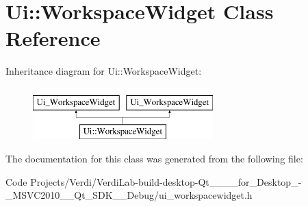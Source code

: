 \hypertarget{class_ui_1_1_workspace_widget}{\section{\-Ui\-:\-:\-Workspace\-Widget \-Class \-Reference}
\label{class_ui_1_1_workspace_widget}
}
\-Inheritance diagram for \-Ui\-:\-:\-Workspace\-Widget\-:\begin{figure}[H]
\begin{center}
\leavevmode
\includegraphics[height=2.000000cm]{class_ui_1_1_workspace_widget}
\end{center}
\end{figure}


\-The documentation for this class was generated from the following file\-:\begin{DoxyCompactItemize}
\item 
\-Code Projects/\-Verdi/\-Verdi\-Lab-\/build-\/desktop-\/\-Qt\-\_\-\_\-\_\-\_\-for\-\_\-\-Desktop\-\_\--\/\-\_\-\-M\-S\-V\-C2010\-\_\-\-\_\-\-Qt\-\_\-\-S\-D\-K\-\_\-\-\_\-\-Debug/ui\-\_\-workspacewidget.\-h\end{DoxyCompactItemize}
